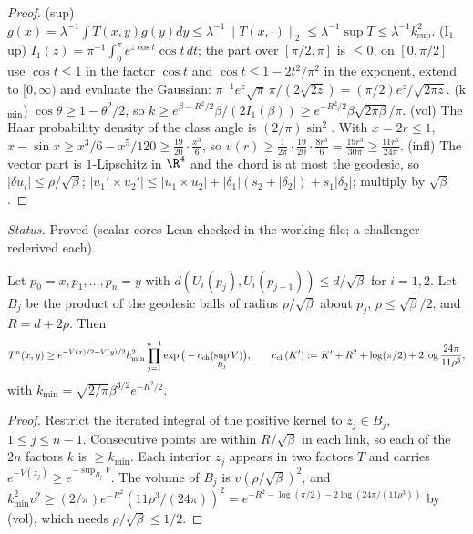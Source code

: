 \begin{proof}
(sup) $g(x)=\lambda^{-1}\int T(x,y)g(y)dy\le\lambda^{-1}\|T(x,\cdot)\|_2\le\lambda^{-1}\sup T\le\lambda^{-1}k_{\sup}^2$.
(I$_1$ up) $I_1(z)=\pi^{-1}\int_0^\pi e^{z\cos t}\cos t\,dt$; the part over $[\pi/2,\pi]$ is $\le0$; on $[0,\pi/2]$ use
$\cos t\le1$ in the factor $\cos t$ and $\cos t\le1-2t^2/\pi^2$ in the exponent, extend to $[0,\infty)$ and evaluate the Gaussian:
$\pi^{-1}e^z\sqrt{\pi}\,\pi/(2\sqrt{2z})=(\pi/2)e^z/\sqrt{2\pi z}$.
(k$_{\min}$) $\cos\theta\ge1-\theta^2/2$, so $k\ge e^{\beta-R^2/2}\beta/(2I_1(\beta))\ge e^{-R^2/2}\beta\sqrt{2\pi\beta}/\pi$.
(vol) The Haar probability density of the class angle is $(2/\pi)\sin^2$. With $x=2r\le1$,
$x-\sin x\ge x^3/6-x^5/120\ge\frac{19}{20}\cdot\frac{x^3}6$, so $v(r)\ge\frac1{2\pi}\cdot\frac{19}{20}\cdot\frac{8r^3}6=\frac{19r^3}{30\pi}\ge\frac{11r^3}{24\pi}$.
(infl) The vector part is $1$-Lipschitz in $\R^4$ and the chord is at most the geodesic, so $|\delta u_i|\le\rho/\sqrt\beta$;
$|u_1'\times u_2'|\le|u_1\times u_2|+|\delta_1|(s_2+|\delta_2|)+s_1|\delta_2|$; multiply by $\sqrt\beta$.
\end{proof}

\noindent\emph{Status.} Proved (scalar cores Lean-checked in the working file; a challenger rederived each).

\begin{lemma}[Chain]\label{tu:L-chain}
Let $p_0=x,p_1,\dots,p_n=y$ with $d(U_i(p_j),U_i(p_{j+1}))\le d/\sqrt\beta$ for $i=1,2$. Let $B_j$ be the product of
the geodesic balls of radius $\rho/\sqrt\beta$ about $p_j$, $\rho\le\sqrt\beta/2$, and $R=d+2\rho$. Then
\[
T^n(x,y)\ge e^{-V(x)/2-V(y)/2}k_{\min}^2\prod_{j=1}^{n-1}\exp\big(-c_{\rm ch}(\sup_{B_j}V)\big),\qquad
c_{\rm ch}(K'):=K'+R^2+\log(\pi/2)+2\log\frac{24\pi}{11\rho^3},
\]
with $k_{\min}=\sqrt{2/\pi}\beta^{3/2}e^{-R^2/2}$.
\end{lemma}

\begin{proof}
Restrict the iterated integral of the positive kernel to $z_j\in B_j$, $1\le j\le n-1$. Consecutive points are within
$R/\sqrt\beta$ in each link, so each of the $2n$ factors $k$ is $\ge k_{\min}$. Each interior $z_j$ appears in two
factors $T$ and carries $e^{-V(z_j)}\ge e^{-\sup_{B_j}V}$. The volume of $B_j$ is $v(\rho/\sqrt\beta)^2$, and
$k_{\min}^2v^2\ge(2/\pi)e^{-R^2}(11\rho^3/(24\pi))^2=e^{-R^2-\log(\pi/2)-2\log(24\pi/(11\rho^3))}$ by (vol), which needs
$\rho/\sqrt\beta\le1/2$.
\end{proof}

